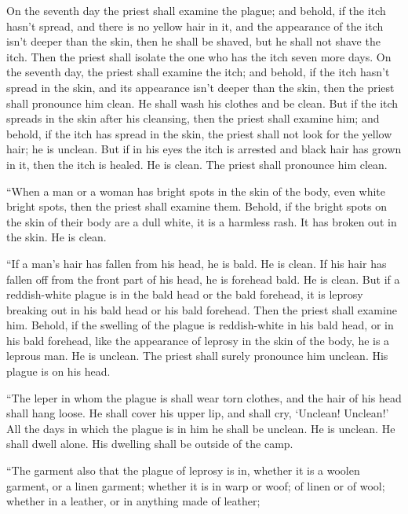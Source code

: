 {On the seventh day the priest shall examine the plague; and behold, if the itch hasn’t spread, and there is no yellow hair in it, and the appearance of the itch isn’t deeper than the skin,
then he shall be shaved, but he shall not shave the itch. Then the priest shall isolate the one who has the itch seven more days.
On the seventh day, the priest shall examine the itch; and behold, if the itch hasn’t spread in the skin, and its appearance isn’t deeper than the skin, then the priest shall pronounce him clean. He shall wash his clothes and be clean.
But if the itch spreads in the skin after his cleansing,
then the priest shall examine him; and behold, if the itch has spread in the skin, the priest shall not look for the yellow hair; he is unclean.
But if in his eyes the itch is arrested and black hair has grown in it, then the itch is healed. He is clean. The priest shall pronounce him clean.
\par }{\PP {}“When a man or a woman has bright spots in the skin of the body, even white bright spots,
then the priest shall examine them. Behold, if the bright spots on the skin of their body are a dull white, it is a harmless rash. It has broken out in the skin. He is clean.
\par }{\PP {}“If a man’s hair has fallen from his head, he is bald. He is clean.
If his hair has fallen off from the front part of his head, he is forehead bald. He is clean.
But if a reddish-white plague is in the bald head or the bald forehead, it is leprosy breaking out in his bald head or his bald forehead.
Then the priest shall examine him. Behold, if the swelling of the plague is reddish-white in his bald head, or in his bald forehead, like the appearance of leprosy in the skin of the body,
he is a leprous man. He is unclean. The priest shall surely pronounce him unclean. His plague is on his head.
\par }{\PP {}“The leper in whom the plague is shall wear torn clothes, and the hair of his head shall hang loose. He shall cover his upper lip, and shall cry, ‘Unclean! Unclean!’
All the days in which the plague is in him he shall be unclean. He is unclean. He shall dwell alone. His dwelling shall be outside of the camp.
\par }{\PP {}“The garment also that the plague of leprosy is in, whether it is a woolen garment, or a linen garment;
whether it is in warp or woof; of linen or of wool; whether in a leather, or in anything made of leather;
}
